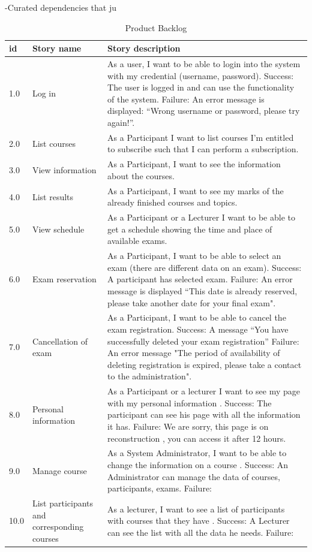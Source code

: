 \documentclass{scrartcl}
\begin{document}
-Curated dependencies that ju \begin{table}[H]
\begin{center}
\begin{tabular}{| p{2.5cm}| p{4cm} | p{9cm} |}
\hline
\textbf{id} & \textbf{Story name} & \textbf{Story description}\\
\hline      
	
	1.0 & Log in & As a user, I want to be able to login into the system with my credential (username, password).
 Success: The user is logged in and can use the functionality of the system.
 Failure: An error message is displayed: “Wrong username or password, please try again!”. \\ \hline
	2.0 & List courses & As a Participant I want to list courses I'm entitled to subscribe such that I can perform a subscription. \\ \hline
	3.0 & View information & As a Participant, I want to see the information about the courses. \\ \hline
	4.0 & List results & As a Participant, I want to see my marks of the already finished courses and topics. \\ \hline
	5.0 & View schedule & As a Participant or a Lecturer I want to be able to get a schedule showing the time and place of available exams. \\ \hline
	6.0 & Exam reservation & As a Participant, I want to be able to select an exam (there are different data on an exam).
 Success: A participant has selected exam.
 Failure: An error message is displayed “This date is already reserved, please take another date for your final exam". \\ \hline
	7.0 & Cancellation of exam & As a Participant, I want to be able to cancel the exam registration.
 Success: A message “You have successfully deleted your exam registration”
 Failure: An error message "The period of availability of deleting registration is expired, please take a contact to the administration". \\ \hline
	8.0 & Personal information & As a Participant or a lecturer I want to see my page with my personal information .
 Success: The participant can see his page with all the information it has.
 Failure: We are sorry, this page is on reconstruction , you can access it after 12 hours. \\ \hline
	9.0 & Manage course & As a System Administrator, I want to be able to change the information on a course .
 Success: An Administrator can manage the data of courses, participants, exams.
 Failure: \\ \hline
	10.0 & List participants and corresponding courses & As a lecturer, I want to see a list of participants with courses that they have .
 Success: A Lecturer can see the list with all the data he needs.
 Failure: \\ \hline


        
        \end{tabular}
\end{center}
\caption{Product Backlog}
\label{table2}
\end{table}
\end{document}
